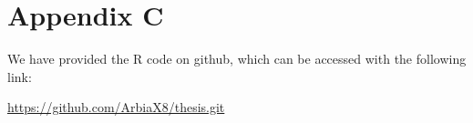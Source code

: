 %
%

\chapter{Appendix C}
\label{app:app03}

We have provided the R code on github, which can be accessed with the following link:

\url{https://github.com/ArbiaX8/thesis.git}

